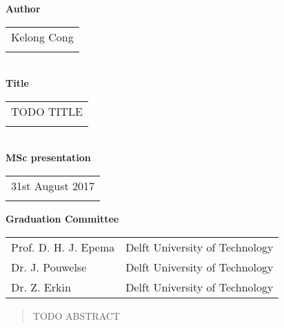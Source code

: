 \thispagestyle{empty}

\noindent \textbf{Author}\\
\begin{tabular}{l}
Kelong Cong\\
\\
\end{tabular}\\
\noindent \textbf{Title}\\
\begin{tabular}{l}
TODO TITLE\\
\\
\end{tabular}\\
\noindent \textbf{MSc presentation}\\
\begin{tabular}{l}
31st August 2017\\
\\
\end{tabular}

\vspace{1.1cm}

\noindent \textbf{Graduation Committee}\\
\begin{tabular}{ll}
Prof. D. H. J. Epema           & Delft University of Technology \\
Dr. J. Pouwelse                & Delft University of Technology \\
Dr. Z. Erkin                   & Delft University of Technology \\
\end{tabular}

\begin{abstract} %
TODO ABSTRACT
\end{abstract}

\clearpage


